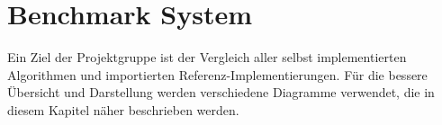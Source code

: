\section{Benchmark System}
\label{framework:benchmarks}

Ein  Ziel der Projektgruppe \sacabench ist der Vergleich aller selbst implementierten Algorithmen und importierten Referenz-Implementierungen. Für die bessere Übersicht und Darstellung werden verschiedene Diagramme verwendet, die in diesem Kapitel näher beschrieben werden.





